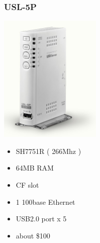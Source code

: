\documentclass[cjk,dvipdfm,12pt]{beamer}
\begin{document}
\begin{frame}
 \frametitle{USL-5P}
 \begin{minipage}[t]{0.4\hsize}
  \includegraphics[width=0.8\hsize]{image200705/usl5p.png}
 \end{minipage} 
 \begin{minipage}[t]{0.5\hsize}
  \begin{itemize}
   \item SH7751R ( 266Mhz )
   \item 64MB RAM 
   \item CF slot 
   \item 1 100base Ethernet
   \item USB2.0 port x 5
   \item about \$100
  \end{itemize}
 \end{minipage}
\end{frame}
\end{document}
